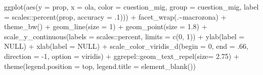 \documentclass[
  12pt,
]{book}
\newenvironment{Shaded}{\begin{snugshade}}{\end{snugshade}}
\newcommand{\AttributeTok}[1]{\textcolor[rgb]{0.77,0.63,0.00}{#1}}
\newcommand{\ConstantTok}[1]{\textcolor[rgb]{0.00,0.00,0.00}{#1}}
\newcommand{\DecValTok}[1]{\textcolor[rgb]{0.00,0.00,0.81}{#1}}
\newcommand{\FloatTok}[1]{\textcolor[rgb]{0.00,0.00,0.81}{#1}}
\newcommand{\FunctionTok}[1]{\textcolor[rgb]{0.00,0.00,0.00}{#1}}
\newcommand{\NormalTok}[1]{#1}
\newcommand{\SpecialCharTok}[1]{\textcolor[rgb]{0.00,0.00,0.00}{#1}}
\newcommand{\StringTok}[1]{\textcolor[rgb]{0.31,0.60,0.02}{#1}}
\begin{document}
\begin{Shaded}
\begin{Highlighting}[]
\FunctionTok{ggplot}\NormalTok{(}\FunctionTok{aes}\NormalTok{(}\AttributeTok{y =}\NormalTok{ prop, }\AttributeTok{x =}\NormalTok{ ola, }\AttributeTok{color =}\NormalTok{ cuestion\_mig, }\AttributeTok{group =}\NormalTok{ cuestion\_mig,}
             \AttributeTok{label =}\NormalTok{ scales}\SpecialCharTok{::}\FunctionTok{percent}\NormalTok{(prop, }\AttributeTok{accuracy =}\NormalTok{ .}\DecValTok{1}\NormalTok{))) }\SpecialCharTok{+}
  \FunctionTok{facet\_wrap}\NormalTok{(.}\SpecialCharTok{\textasciitilde{}}\NormalTok{macrozona) }\SpecialCharTok{+}
  \FunctionTok{theme\_bw}\NormalTok{() }\SpecialCharTok{+}   
  \FunctionTok{geom\_line}\NormalTok{(}\AttributeTok{size =} \DecValTok{1}\NormalTok{) }\SpecialCharTok{+}
  \FunctionTok{geom\_point}\NormalTok{(}\AttributeTok{size =} \FloatTok{1.8}\NormalTok{) }\SpecialCharTok{+}
  \FunctionTok{scale\_y\_continuous}\NormalTok{(}\AttributeTok{labels =}\NormalTok{ scales}\SpecialCharTok{::}\NormalTok{percent,}
                     \AttributeTok{limits =} \FunctionTok{c}\NormalTok{(}\DecValTok{0}\NormalTok{, }\DecValTok{1}\NormalTok{)) }\SpecialCharTok{+}
  \FunctionTok{ylab}\NormalTok{(}\AttributeTok{label =} \ConstantTok{NULL}\NormalTok{) }\SpecialCharTok{+}
  \FunctionTok{xlab}\NormalTok{(}\AttributeTok{label =} \ConstantTok{NULL}\NormalTok{) }\SpecialCharTok{+}
  \FunctionTok{scale\_color\_viridis\_d}\NormalTok{(}\AttributeTok{begin =} \DecValTok{0}\NormalTok{, }\AttributeTok{end =}\NormalTok{ .}\DecValTok{66}\NormalTok{, }\AttributeTok{direction =} \SpecialCharTok{{-}}\DecValTok{1}\NormalTok{, }\AttributeTok{option =} \StringTok{\textquotesingle{}viridis\textquotesingle{}}\NormalTok{) }\SpecialCharTok{+}
\NormalTok{  ggrepel}\SpecialCharTok{::}\FunctionTok{geom\_text\_repel}\NormalTok{(}\AttributeTok{size=} \FloatTok{2.75}\NormalTok{) }\SpecialCharTok{+}
  \FunctionTok{theme}\NormalTok{(}\AttributeTok{legend.position =} \StringTok{\textquotesingle{}top\textquotesingle{}}\NormalTok{,}
        \AttributeTok{legend.title =} \FunctionTok{element\_blank}\NormalTok{())}
\end{Highlighting}
\end{Shaded}
\end{document}
